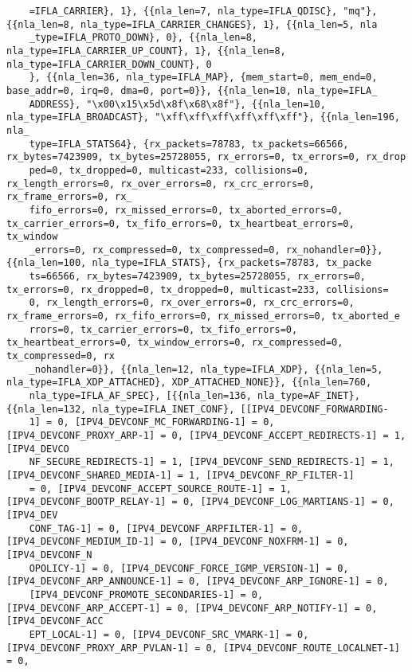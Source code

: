 \documentclass[pdf, unicode, 12pt, a4paper,oneside,fleqn]{article}
\begin{document}
{\begin{verbatim}
    =IFLA_CARRIER}, 1}, {{nla_len=7, nla_type=IFLA_QDISC}, "mq"}, {{nla_len=8, nla_type=IFLA_CARRIER_CHANGES}, 1}, {{nla_len=5, nla
    _type=IFLA_PROTO_DOWN}, 0}, {{nla_len=8, nla_type=IFLA_CARRIER_UP_COUNT}, 1}, {{nla_len=8, nla_type=IFLA_CARRIER_DOWN_COUNT}, 0
    }, {{nla_len=36, nla_type=IFLA_MAP}, {mem_start=0, mem_end=0, base_addr=0, irq=0, dma=0, port=0}}, {{nla_len=10, nla_type=IFLA_
    ADDRESS}, "\x00\x15\x5d\x8f\x68\x8f"}, {{nla_len=10, nla_type=IFLA_BROADCAST}, "\xff\xff\xff\xff\xff\xff"}, {{nla_len=196, nla_
    type=IFLA_STATS64}, {rx_packets=78783, tx_packets=66566, rx_bytes=7423909, tx_bytes=25728055, rx_errors=0, tx_errors=0, rx_drop
    ped=0, tx_dropped=0, multicast=233, collisions=0, rx_length_errors=0, rx_over_errors=0, rx_crc_errors=0, rx_frame_errors=0, rx_
    fifo_errors=0, rx_missed_errors=0, tx_aborted_errors=0, tx_carrier_errors=0, tx_fifo_errors=0, tx_heartbeat_errors=0, tx_window
    _errors=0, rx_compressed=0, tx_compressed=0, rx_nohandler=0}}, {{nla_len=100, nla_type=IFLA_STATS}, {rx_packets=78783, tx_packe
    ts=66566, rx_bytes=7423909, tx_bytes=25728055, rx_errors=0, tx_errors=0, rx_dropped=0, tx_dropped=0, multicast=233, collisions=
    0, rx_length_errors=0, rx_over_errors=0, rx_crc_errors=0, rx_frame_errors=0, rx_fifo_errors=0, rx_missed_errors=0, tx_aborted_e
    rrors=0, tx_carrier_errors=0, tx_fifo_errors=0, tx_heartbeat_errors=0, tx_window_errors=0, rx_compressed=0, tx_compressed=0, rx
    _nohandler=0}}, {{nla_len=12, nla_type=IFLA_XDP}, {{nla_len=5, nla_type=IFLA_XDP_ATTACHED}, XDP_ATTACHED_NONE}}, {{nla_len=760,
    nla_type=IFLA_AF_SPEC}, [{{nla_len=136, nla_type=AF_INET}, {{nla_len=132, nla_type=IFLA_INET_CONF}, [[IPV4_DEVCONF_FORWARDING-
    1] = 0, [IPV4_DEVCONF_MC_FORWARDING-1] = 0, [IPV4_DEVCONF_PROXY_ARP-1] = 0, [IPV4_DEVCONF_ACCEPT_REDIRECTS-1] = 1, [IPV4_DEVCO
    NF_SECURE_REDIRECTS-1] = 1, [IPV4_DEVCONF_SEND_REDIRECTS-1] = 1, [IPV4_DEVCONF_SHARED_MEDIA-1] = 1, [IPV4_DEVCONF_RP_FILTER-1]
    = 0, [IPV4_DEVCONF_ACCEPT_SOURCE_ROUTE-1] = 1, [IPV4_DEVCONF_BOOTP_RELAY-1] = 0, [IPV4_DEVCONF_LOG_MARTIANS-1] = 0, [IPV4_DEV
    CONF_TAG-1] = 0, [IPV4_DEVCONF_ARPFILTER-1] = 0, [IPV4_DEVCONF_MEDIUM_ID-1] = 0, [IPV4_DEVCONF_NOXFRM-1] = 0, [IPV4_DEVCONF_N
    OPOLICY-1] = 0, [IPV4_DEVCONF_FORCE_IGMP_VERSION-1] = 0, [IPV4_DEVCONF_ARP_ANNOUNCE-1] = 0, [IPV4_DEVCONF_ARP_IGNORE-1] = 0, 
    [IPV4_DEVCONF_PROMOTE_SECONDARIES-1] = 0, [IPV4_DEVCONF_ARP_ACCEPT-1] = 0, [IPV4_DEVCONF_ARP_NOTIFY-1] = 0, [IPV4_DEVCONF_ACC
    EPT_LOCAL-1] = 0, [IPV4_DEVCONF_SRC_VMARK-1] = 0, [IPV4_DEVCONF_PROXY_ARP_PVLAN-1] = 0, [IPV4_DEVCONF_ROUTE_LOCALNET-1] = 0, 

\end{verbatim}}
\end{document}
